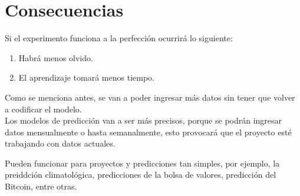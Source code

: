 \section{Consecuencias}

    Si el experimento funciona a la perfecci\'on ocurrir\'a lo siguiente:
    \begin{enumerate}
        \item Habrá menos olvido.
        \item El aprendizaje tomará menos tiempo.
    \end{enumerate}

    Como se menciona antes, se van a poder ingresar m\'as datos sin 
    tener que volver a codificar el modelo.\\
    Los modelos de predicci\'on van a ser m\'as precisos, porque se podrán ingresar 
    datos mensualmente o hasta semanalmente, esto provocar\'a que el proyecto est\'e trabajando 
    con datos actuales.

    Pueden funcionar para proyectos y predicciones tan simples, por ejemplo, la preiddci\'on climatol\'ogica, 
    predicciones de la bolsa de valores, predicci\'on del Bitcoin, entre otras.
